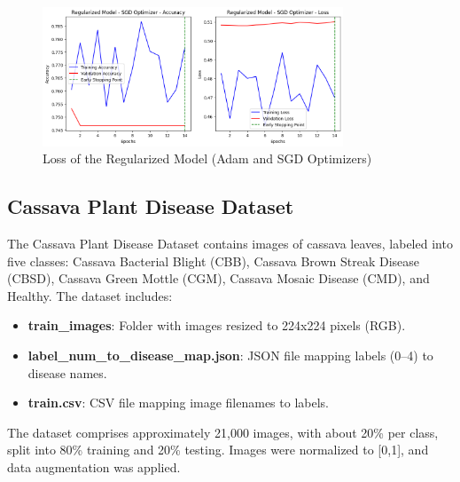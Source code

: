 \documentclass[a4paper,12pt]{article}
\begin{document}
\begin{figure}[H]
    \centering
    \includegraphics[width=0.8\textwidth]{assets/diabetes/sgd_diabetes_loss.png}
    \caption{Loss of the Regularized Model (Adam and SGD Optimizers)}
\end{figure}

\clearpage

\subsection*{Cassava Plant Disease Dataset}
The Cassava Plant Disease Dataset contains images of cassava leaves, labeled into five classes: Cassava Bacterial Blight (CBB), Cassava Brown Streak Disease (CBSD), Cassava Green Mottle (CGM), Cassava Mosaic Disease (CMD), and Healthy. The dataset includes:
\begin{itemize}
    \item \textbf{train\_images}: Folder with images resized to 224x224 pixels (RGB).
    \item \textbf{label\_num\_to\_disease\_map.json}: JSON file mapping labels (0–4) to disease names.
    \item \textbf{train.csv}: CSV file mapping image filenames to labels.
\end{itemize}
The dataset comprises approximately 21,000 images, with about 20\% per class, split into 80\% training and 20\% testing. Images were normalized to [0,1], and data augmentation was applied.
\end{document}
